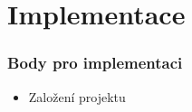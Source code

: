 
\chapter{Implementace}

\subsection{Body pro implementaci}
\begin{itemize}
    \item Založení projektu
\end{itemize}

